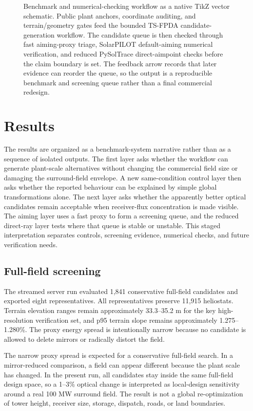 \documentclass[final,3p,times]{elsarticle}
\begin{document}
\begin{figure}[t]
{%
}
\caption{Benchmark and numerical-checking workflow as a native TikZ vector schematic. Public plant anchors, coordinate auditing, and terrain/geometry gates feed the bounded TS-FPDA candidate-generation workflow. The candidate queue is then checked through fast aiming-proxy triage, SolarPILOT default-aiming numerical verification, and reduced PySolTrace direct-aimpoint checks before the claim boundary is set. The feedback arrow records that later evidence can reorder the queue, so the output is a reproducible benchmark and screening queue rather than a final commercial redesign.}
\label{fig:workflow}
\end{figure}

\section{Results}
The results are organized as a benchmark-system narrative rather than as a sequence of isolated outputs. The first layer asks whether the workflow can generate plant-scale alternatives without changing the commercial field size or damaging the surround-field envelope. A new same-condition control layer then asks whether the reported behaviour can be explained by simple global transformations alone. The next layer asks whether the apparently better optical candidates remain acceptable when receiver-flux concentration is made visible. The aiming layer uses a fast proxy to form a screening queue, and the reduced direct-ray layer tests where that queue is stable or unstable. This staged interpretation separates controls, screening evidence, numerical checks, and future verification needs.

\subsection{Full-field screening}
The streamed server run evaluated 1,841 conservative full-field candidates and exported eight representatives. All representatives preserve 11,915 heliostats. Terrain elevation ranges remain approximately 33.3--35.2 m for the key high-resolution verification set, and p95 terrain slope remains approximately 1.275--1.280\%. The proxy energy spread is intentionally narrow because no candidate is allowed to delete mirrors or radically distort the field.

The narrow proxy spread is expected for a conservative full-field search. In a mirror-reduced comparison, a field can appear different because the plant scale has changed. In the present run, all candidates stay inside the same full-field design space, so a 1--3\% optical change is interpreted as local-design sensitivity around a real 100 MW surround field. The result is not a global re-optimization of tower height, receiver size, storage, dispatch, roads, or land boundaries.
\end{document}
